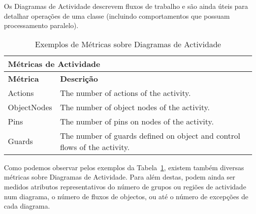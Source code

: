 Os Diagramas de Actividade descrevem fluxos de trabalho e são ainda úteis para detalhar operações de uma classe (incluindo comportamentos que possuam processamento paralelo).


\begin{center}
\begin{table}[h]
\begin{tabular}{ p{2cm}|   p{}}
\multicolumn{2}{l}{\textbf{Métricas de Actividade}} \\ \hline
\textbf{Métrica} & \textbf{Descrição} \\ \hline
Actions  & The number of actions of the activity. \\ \hline 
ObjectNodes & The number of object nodes of the activity. \\ \hline 
Pins  & The number of pins on nodes of the activity. \\ \hline 
Guards  & The number of guards defined on object and control flows of the activity. \\ \hline 
\end{tabular}
\caption{\small{Exemplos de Métricas sobre Diagramas de Actividade}}
\label{t:act}
\end{table}
\end{center}

Como podemos observar pelos exemplos da Tabela~\ref{t:act}, existem também diversas métricas sobre Diagramas de Actividade. 
Para além destas, podem ainda ser medidos atributos representativos do número de grupos ou regiões de actividade num diagrama, o número de fluxos de objectos, ou até o número de excepções de cada diagrama.